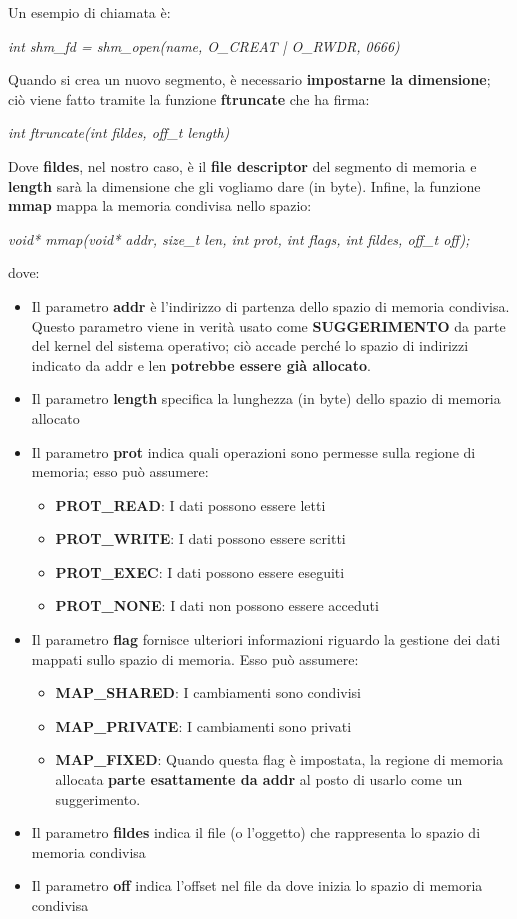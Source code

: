 \documentclass[12pt]{article}
\begin{document}
Un esempio di chiamata è:
\begin{center}
    \textit{int shm\_fd = shm\_open(name, O\_CREAT | O\_RWDR, 0666)}
\end{center}
Quando si crea un nuovo segmento, è necessario \textbf{impostarne la dimensione}; ciò viene fatto tramite la funzione
\textbf{ftruncate} che ha firma:
\begin{center}
    \textit{int ftruncate(int fildes, off\_t length)}
\end{center}
Dove \textbf{fildes}, nel nostro caso, è il \textbf{file descriptor} del segmento di memoria e \textbf{length} sarà la dimensione
che gli vogliamo dare (in byte).
Infine, la funzione \textbf{mmap} mappa la memoria condivisa nello spazio:
\begin{center}
    \textit{void* mmap(void* addr, size\_t len, int prot, int flags, int fildes, off\_t off);}
\end{center}
dove:
\begin{itemize}
    \item Il parametro \textbf{addr} è l'indirizzo di partenza dello spazio di memoria condivisa. Questo parametro viene in verità usato come
    \textbf{SUGGERIMENTO} da parte del kernel del sistema operativo; ciò accade perché lo spazio di indirizzi indicato da addr e len \textbf{potrebbe essere già allocato}.
    \item Il parametro \textbf{length} specifica la lunghezza (in byte) dello spazio di memoria allocato
    \item Il parametro \textbf{prot} indica quali operazioni sono permesse sulla regione di memoria; esso può assumere:
    \begin{itemize}
        \item \textbf{PROT\_READ}: I dati possono essere letti
        \item \textbf{PROT\_WRITE}: I dati possono essere scritti
        \item \textbf{PROT\_EXEC}: I dati possono essere eseguiti
        \item \textbf{PROT\_NONE}: I dati non possono essere acceduti
    \end{itemize}
    \item Il parametro \textbf{flag} fornisce ulteriori informazioni riguardo la gestione dei dati mappati sullo spazio di memoria. Esso può assumere:
    \begin{itemize}
        \item \textbf{MAP\_SHARED}: I cambiamenti sono condivisi
        \item \textbf{MAP\_PRIVATE}: I cambiamenti sono privati
        \item \textbf{MAP\_FIXED}: Quando questa flag è impostata, la regione di memoria allocata \textbf{parte esattamente da addr} al posto di usarlo come un suggerimento.
    \end{itemize}
    \item Il parametro \textbf{fildes} indica il file (o l'oggetto) che rappresenta lo spazio di memoria condivisa
    \item Il parametro \textbf{off} indica l'offset nel file da dove inizia lo spazio di memoria condivisa
\end{itemize}
\end{document}
